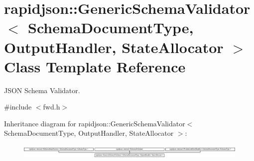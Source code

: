 \hypertarget{classrapidjson_1_1_generic_schema_validator}{}\section{rapidjson\+::Generic\+Schema\+Validator$<$ Schema\+Document\+Type, Output\+Handler, State\+Allocator $>$ Class Template Reference}
\label{classrapidjson_1_1_generic_schema_validator}


J\+S\+ON Schema Validator.  




{\ttfamily \#include $<$fwd.\+h$>$}

Inheritance diagram for rapidjson\+::Generic\+Schema\+Validator$<$ Schema\+Document\+Type, Output\+Handler, State\+Allocator $>$\+:\begin{figure}[H]
\begin{center}
\leavevmode
\includegraphics[height=0.677556cm]{classrapidjson_1_1_generic_schema_validator}
\end{center}
\end{figure}
